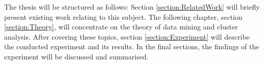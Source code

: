 


The thesis will be structured as follows: Section \ref{section:RelatedWork} will briefly present existing work relating to this subject. The following chapter, section \ref{section:Theory}, will concentrate on the theory of data mining and cluster analysis. After covering these topics, section \ref{section:Experiment} will describe the conducted experiment and its results. In the final sections, the findings of the experiment will be discussed and summarised. 

